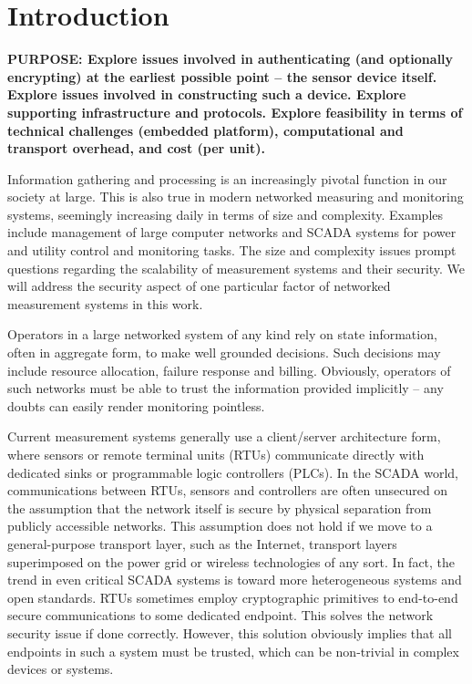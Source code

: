 
\chapter{Introduction}
\label{sec:intro}

\textbf{PURPOSE: Explore issues involved in authenticating (and optionally encrypting) at the earliest possible point -- the sensor device itself. Explore issues involved in constructing such a device. Explore supporting infrastructure and protocols. Explore feasibility in terms of technical challenges (embedded platform), computational and transport overhead, and cost (per unit).}

Information gathering and processing is an increasingly pivotal function in our society at large. This is also true in modern networked measuring and monitoring systems, seemingly increasing daily in terms of size and complexity. Examples include management of large computer networks and SCADA systems for power and utility control and monitoring tasks. The size and complexity issues prompt questions regarding the scalability of measurement systems and their security. We will address the security aspect of one particular factor of networked measurement systems in this work.

Operators in a large networked system of any kind rely on state information, often in aggregate form, to make well grounded decisions. Such decisions may include resource allocation, failure response and billing. Obviously, operators of such networks must be able to trust the information provided implicitly -- any doubts can easily render monitoring pointless.

Current measurement systems generally use a client/server architecture form, where sensors or remote terminal units (RTUs) communicate directly with dedicated sinks or programmable logic controllers (PLCs). In the SCADA world, communications between RTUs, sensors and controllers are often unsecured on the assumption that the network itself is secure by physical separation from publicly accessible networks. This assumption does not hold if we move to a general-purpose transport layer, such as the Internet, transport layers superimposed on the power grid or wireless technologies of any sort. In fact, the trend in even critical SCADA systems is toward more heterogeneous systems and open standards.
%
RTUs sometimes employ cryptographic primitives to end-to-end secure communications to some dedicated endpoint. This solves the network security issue if done correctly. However, this solution obviously implies that all endpoints in such a system must be trusted, which can be non-trivial in complex devices or systems.

